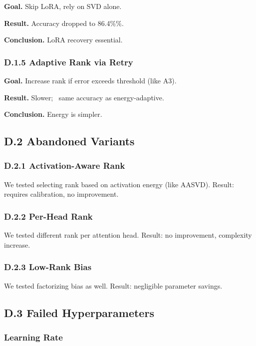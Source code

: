 \textbf{Goal.} Skip LoRA, rely on SVD alone.

\textbf{Result.} Accuracy dropped to 86.4\%\%.

\textbf{Conclusion.} LoRA recovery essential.

\subsubsection{D.1.5 Adaptive Rank via Retry}

\textbf{Goal.} Increase rank if error exceeds threshold (like A3).

\textbf{Result.} Slower; ~same accuracy as energy-adaptive.

\textbf{Conclusion.} Energy is simpler.

\subsection{D.2 Abandoned Variants}

\subsubsection{D.2.1 Activation-Aware Rank}

We tested selecting rank based on activation energy (like AASVD). Result: 
requires calibration, no improvement.

\subsubsection{D.2.2 Per-Head Rank}

We tested different rank per attention head. Result: no improvement, 
complexity increase.

\subsubsection{D.2.3 Low-Rank Bias}

We tested factorizing bias as well. Result: negligible parameter savings.

\subsection{D.3 Failed Hyperparameters}

\subsubsection{Learning Rate}

